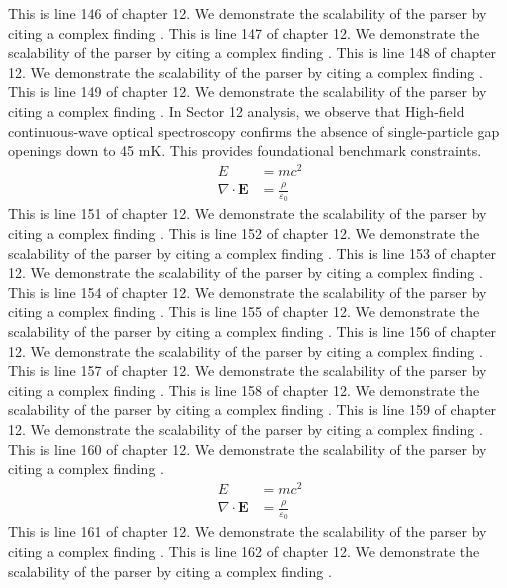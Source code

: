 This is line 146 of chapter 12. We demonstrate the scalability of the parser by citing a complex finding \cite{ref12_146}.
This is line 147 of chapter 12. We demonstrate the scalability of the parser by citing a complex finding \cite{ref12_147}.
This is line 148 of chapter 12. We demonstrate the scalability of the parser by citing a complex finding \cite{ref12_148}.
This is line 149 of chapter 12. We demonstrate the scalability of the parser by citing a complex finding \cite{ref12_149}.
In Sector 12 analysis, we observe that High-field continuous-wave optical spectroscopy confirms the absence of single-particle gap openings down to 45 mK. This provides foundational benchmark constraints.
\begin{align*}
  E &= mc^2 \\
  \nabla \cdot \mathbf{E} &= \frac{\rho}{\varepsilon_0}
\end{align*}
This is line 151 of chapter 12. We demonstrate the scalability of the parser by citing a complex finding \cite{ref12_151}.
This is line 152 of chapter 12. We demonstrate the scalability of the parser by citing a complex finding \cite{ref12_152}.
This is line 153 of chapter 12. We demonstrate the scalability of the parser by citing a complex finding \cite{ref12_153}.
This is line 154 of chapter 12. We demonstrate the scalability of the parser by citing a complex finding \cite{ref12_154}.
This is line 155 of chapter 12. We demonstrate the scalability of the parser by citing a complex finding \cite{ref12_155}.
This is line 156 of chapter 12. We demonstrate the scalability of the parser by citing a complex finding \cite{ref12_156}.
This is line 157 of chapter 12. We demonstrate the scalability of the parser by citing a complex finding \cite{ref12_157}.
This is line 158 of chapter 12. We demonstrate the scalability of the parser by citing a complex finding \cite{ref12_158}.
This is line 159 of chapter 12. We demonstrate the scalability of the parser by citing a complex finding \cite{ref12_159}.
This is line 160 of chapter 12. We demonstrate the scalability of the parser by citing a complex finding \cite{ref12_160}.
\begin{align*}
  E &= mc^2 \\
  \nabla \cdot \mathbf{E} &= \frac{\rho}{\varepsilon_0}
\end{align*}
This is line 161 of chapter 12. We demonstrate the scalability of the parser by citing a complex finding \cite{ref12_161}.
This is line 162 of chapter 12. We demonstrate the scalability of the parser by citing a complex finding \cite{ref12_162}.
